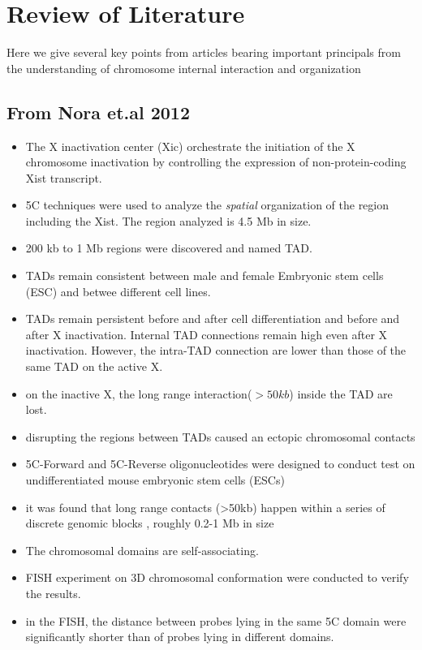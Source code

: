 \documentclass[12pt]{book}
\begin{document}
\chapter{Review of Literature}
Here we give several key points from articles bearing important principals from the understanding of chromosome internal interaction and organization 

\section{From Nora et.al 2012 \cite{nora2012spatial}}
\begin{itemize}
\item The X inactivation center (Xic) orchestrate the initiation of the X chromosome inactivation by controlling the expression of non-protein-coding Xist transcript. 
\item 5C techniques were  used to analyze the \textit{spatial} organization of the region including the Xist. The region analyzed  is 4.5 Mb in size. 
\item 200 kb to 1 Mb regions were discovered and named TAD.
\item TADs remain consistent between male and female Embryonic stem cells (ESC) and betwee different cell lines.
\item TADs remain persistent before and after cell differentiation and before and after X inactivation. Internal TAD connections remain high even after X inactivation. However, the intra-TAD connection are lower than those of the same TAD on the active X.
\item on the inactive X, the long range interaction($>50kb$) inside the TAD are lost. 
\item disrupting the regions between TADs caused an ectopic chromosomal contacts 
\item 5C-Forward and 5C-Reverse oligonucleotides were designed to conduct test on undifferentiated mouse embryonic stem cells (ESCs)
\item it was found that long range contacts (>50kb) happen within a series of discrete genomic blocks , roughly 0.2-1 Mb in size 
\item The chromosomal domains are self-associating. 
\item FISH experiment on 3D chromosomal conformation were conducted to verify the results.
\item in the FISH, the distance between probes lying in the same 5C domain were significantly shorter than of probes lying in different domains. 

\end{itemize}
\end{document}
